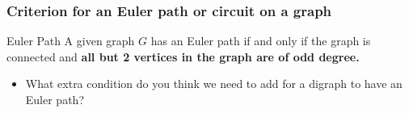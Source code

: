 \documentclass{beamer}
\begin{document}

\begin{frame}
\frametitle{Criterion for an Euler path or circuit on a graph}
\begin{block}{Euler Path}
A given graph $G$ has an Euler path if and only if the graph is connected and \textbf{all but 2 vertices in the graph are of odd degree.}
\end{block}
\pause
\begin{itemize}
\item What extra condition do you think we need to add for a digraph to have an Euler path?
\end{itemize}
\end{frame}

\end{document}
